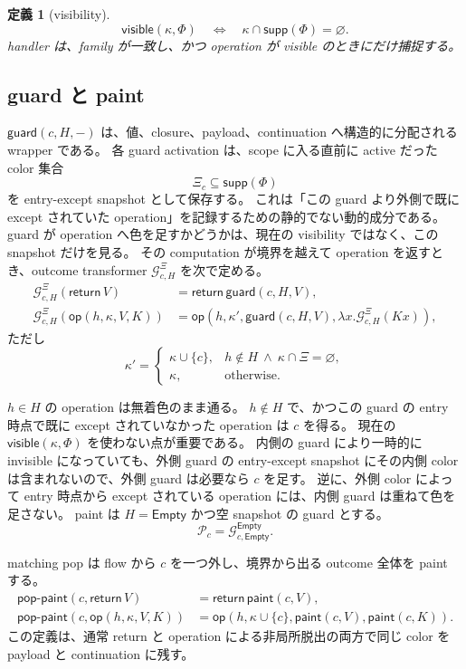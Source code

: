 \documentclass[uplatex,dvipdfmx,a4paper,10.5pt]{jsarticle}
\theoremstyle{jpplain}
\newtheorem{definition}{定義}[section]
\newcommand{\Empty}{\mathsf{Empty}}
\newcommand{\supp}{\mathsf{supp}}
\newcommand{\visible}{\mathsf{visible}}
\newcommand{\guard}{\mathsf{guard}}
\newcommand{\paint}{\mathsf{paint}}
\newcommand{\ret}{\mathsf{return}\,}
\newcommand{\oper}{\mathsf{op}}
\newcommand{\poppaint}{\mathsf{pop\text{-}paint}}
\newcommand{\Guard}{\mathcal G}
\newcommand{\Paint}{\mathcal P}
\begin{document}
\begin{definition}[visibility]
\[
  \visible(\kappa,\Phi)
  \quad\Longleftrightarrow\quad
  \kappa\cap\supp(\Phi)=\varnothing.
\]
handler は、family が一致し、かつ operation が visible のときにだけ捕捉する。
\end{definition}

\subsection{guard と paint}

$\guard(c,H,-)$ は、値、closure、payload、continuation へ構造的に分配される wrapper である。
各 guard activation は、scope に入る直前に active だった color 集合
\[
  \Xi_c\subseteq\supp(\Phi)
\]
を entry-except snapshot として保存する。
これは「この guard より外側で既に except されていた operation」を記録するための静的でない動的成分である。
guard が operation へ色を足すかどうかは、現在の visibility ではなく、この snapshot だけを見る。
その computation が境界を越えて operation を返すとき、outcome transformer
$\Guard^{\Xi}_{c,H}$ を次で定める。
\[
\begin{aligned}
 \Guard^{\Xi}_{c,H}(\ret V)
   &=\ret\guard(c,H,V),\\
 \Guard^{\Xi}_{c,H}(\oper(h,\kappa,V,K))
   &=\oper(h,\kappa',\guard(c,H,V),
      \lambda x.\Guard^{\Xi}_{c,H}(Kx)),
\end{aligned}
\]
ただし
\[
 \kappa'=
 \begin{cases}
   \kappa\cup\{c\},
     & h\notin H\ \land\ \kappa\cap\Xi=\varnothing,\\
   \kappa,&\text{otherwise}.
 \end{cases}
\]

$h\in H$ の operation は無着色のまま通る。
$h\notin H$ で、かつこの guard の entry 時点で既に except されていなかった operation は $c$ を得る。
現在の $\visible(\kappa,\Phi)$ を使わない点が重要である。
内側の guard により一時的に invisible になっていても、外側 guard の entry-except snapshot にその内側 color は含まれないので、外側 guard は必要なら $c$ を足す。
逆に、外側 color によって entry 時点から except されている operation には、内側 guard は重ねて色を足さない。
paint は $H=\Empty$ かつ空 snapshot の guard とする。
\[
  \Paint_c=\Guard_{c,\Empty}^{\Empty}.
\]

matching pop は flow から $c$ を一つ外し、境界から出る outcome 全体を paint する。
\[
\begin{aligned}
 \poppaint(c,\ret V)
   &=\ret\paint(c,V),\\
 \poppaint(c,\oper(h,\kappa,V,K))
   &=\oper(h,\kappa\cup\{c\},\paint(c,V),\paint(c,K)).
\end{aligned}
\]
この定義は、通常 return と operation による非局所脱出の両方で同じ color を payload と continuation に残す。
\end{document}
